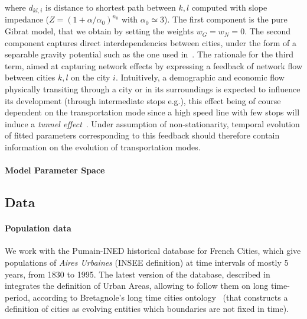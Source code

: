 \documentclass[Royal,sageh,times]{sagej}
\begin{document}
where $d_{kl,i}$ is distance to shortest path between $k,l$ computed with slope impedance ($Z=\left(1+\alpha/\alpha_0\right)^{n_0}$ with $\alpha_0\simeq 3$). The first component is the pure Gibrat model, that we obtain by setting the weights $w_G = w_N = 0$. The second component captures direct interdependencies between cities, under the form of a separable gravity potential such as the one used in~\cite{sanders1992systeme}. The rationale for the third term, aimed at capturing network effects by expressing a feedback of network flow between cities $k,l$ on the city $i$. Intuitively, a demographic and economic flow physically transiting through a city or in its surroundings is expected to influence its development (through intermediate stops e.g.), this effect being of course dependent on the transportation mode since a high speed line with few stops will induce a \emph{tunnel effect}~\cite{}.%
 Under assumption of non-stationarity, temporal evolution of fitted parameters corresponding to this feedback should therefore contain information on the evolution of transportation modes.




\paragraph{Model Parameter Space}






\subsection*{Data}

\paragraph{Population data}

We work with the Pumain-INED historical database for French Cities, which give populations of \emph{Aires Urbaines} (INSEE definition) at time intervals of mostly 5 years, from 1830 to 1995. %
The latest version of the database, described in~\cite{pumain1986fichier} integrates the definition of Urban Areas, allowing to follow them on long time-period, according to Bretagnole's long time cities ontology~\cite{bretagnolle:tel-00459720} (that constructs a definition of cities as evolving entities which boundaries are not fixed in time).
\end{document}
